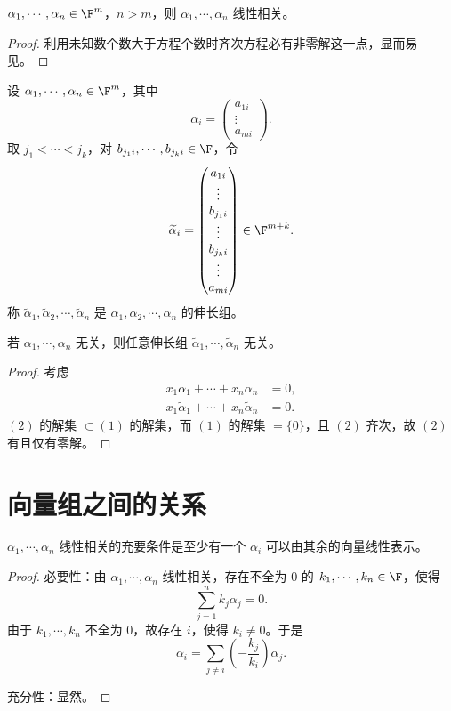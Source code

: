\begin{proposition}\label{2.2.7}
	$\alpha_1,\cdots,\alpha_n\in\F^m$，$n>m$，则 $\alpha_1,\cdots,\alpha_n$ 线性相关。
\end{proposition}
\begin{proof}
	利用未知数个数大于方程个数时齐次方程必有非零解这一点，显而易见。
\end{proof}

\begin{definition}
	设 $\alpha_1,\cdots,\alpha_n\in\F^m$，其中
	\[
	\alpha_i=
	\begin{pmatrix}
		a_{1i}\\
		\vdots\\
		a_{mi}
	\end{pmatrix}.
	\]
	取 $j_1<\cdots<j_k$，对 $b_{j_1 i},\cdots,b_{j_k i}\in\F$，令
	\[
	\widetilde{\alpha}_i=
	\begin{pmatrix}
		a_{1i}\\
		\vdots\\
		b_{j_1 i}\\
		\vdots\\
		b_{j_k i}\\
		\vdots\\
		a_{mi}
	\end{pmatrix}\in\F^{m+k}.
	\]
	称 $\widetilde{\alpha}_1,\widetilde{\alpha}_2,\cdots,\widetilde{\alpha}_n$ 是 $\alpha_1,\alpha_2,\cdots,\alpha_n$ 的伸长组。
\end{definition}

\begin{proposition}
	若 $\alpha_1,\cdots,\alpha_n$ 无关，则任意伸长组 $\widetilde{\alpha}_1,\cdots,\widetilde{\alpha}_n$ 无关。
\end{proposition}
\begin{proof}
	考虑
	\begin{align}
		x_1\alpha_1+\cdots+x_n\alpha_n&=0,\tag{1}\\
		x_1\widetilde{\alpha}_1+\cdots+x_n\widetilde{\alpha}_n&=0.\tag{2}
	\end{align}
	$(2)$ 的解集 $\subset (1)$ 的解集，而 $(1)$ 的解集 $=\{0\}$，且 $(2)$ 齐次，故 $(2)$ 有且仅有零解。
\end{proof}

\section{向量组之间的关系}

\begin{lemma}
	$\alpha_1,\cdots,\alpha_n$ 线性相关的充要条件是至少有一个 $\alpha_i$ 可以由其余的向量线性表示。
\end{lemma}
\begin{proof}
	必要性：由 $\alpha_1,\cdots,\alpha_n$ 线性相关，存在不全为 $0$ 的
	$k_1,\cdots,k_n\in\F$，使得
	\[
	\sum_{j=1}^n k_j\alpha_j=0.
	\]
	由于 $k_1,\cdots,k_n$ 不全为 $0$，故存在 $i$，使得 $k_i\neq0$。于是
	\[
	\alpha_i=\sum_{j\neq i}\left(-\frac{k_j}{k_i}\right)\alpha_j.
	\]

	充分性：显然。
\end{proof}

